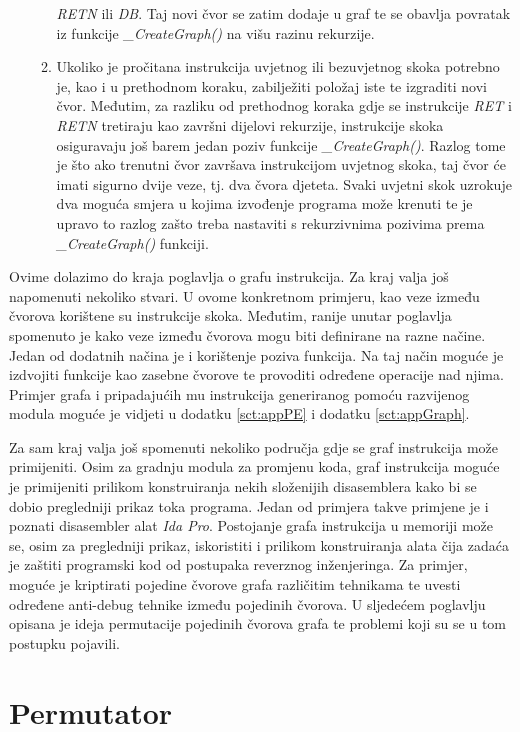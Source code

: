 \documentclass[times, utf8, diplomski, numeric]{fer}
\begin{document}
\begin{enumerate}
\begin{enumerate}
\emph{RETN} ili \emph{DB}. Taj novi čvor se zatim dodaje u graf te se obavlja
povratak iz funkcije \emph{\_CreateGraph()} na višu razinu rekurzije.
\item Ukoliko je pročitana instrukcija uvjetnog ili bezuvjetnog skoka potrebno
je, kao i u prethodnom koraku, zabilježiti položaj iste te izgraditi novi čvor.
Međutim, za razliku od prethodnog koraka gdje se instrukcije \emph{RET} i
\emph{RETN} tretiraju kao završni dijelovi rekurzije, instrukcije skoka
osiguravaju još barem jedan poziv funkcije \emph{\_CreateGraph()}. Razlog tome
je što ako trenutni čvor završava instrukcijom uvjetnog skoka, taj čvor će
imati sigurno dvije veze, tj. dva čvora djeteta. Svaki uvjetni skok uzrokuje
dva moguća smjera u kojima izvođenje programa može krenuti te je upravo to
razlog zašto treba nastaviti s rekurzivnima pozivima prema
\emph{\_CreateGraph()} funkciji.
\end{enumerate}
\end{enumerate} 
Ovime dolazimo do kraja poglavlja o grafu instrukcija. Za kraj valja još
napomenuti nekoliko stvari. U ovome konkretnom primjeru, kao veze između
čvorova korištene su instrukcije skoka. Međutim, ranije unutar poglavlja
spomenuto je kako veze između čvorova mogu biti definirane na razne načine.
Jedan od dodatnih načina je i korištenje poziva funkcija. Na taj način moguće
je izdvojiti funkcije kao zasebne čvorove te provoditi određene operacije nad
njima. Primjer grafa i pripadajućih mu instrukcija generiranog pomoću
razvijenog modula moguće je vidjeti u dodatku \ref{sct:appPE} i dodatku
\ref{sct:appGraph}.

Za sam kraj valja još spomenuti nekoliko područja gdje se graf instrukcija može
primijeniti. Osim za gradnju modula za promjenu koda, graf instrukcija moguće
je primijeniti prilikom konstruiranja nekih složenijih disasemblera kako bi se
dobio pregledniji prikaz toka programa. Jedan od primjera takve primjene je i
poznati disasembler alat \emph{Ida Pro}\citep{ida}. Postojanje grafa
instrukcija u memoriji može se, osim za pregledniji prikaz, iskoristiti i
prilikom konstruiranja alata čija zadaća je zaštiti programski kod od postupaka
reverznog inženjeringa. Za primjer, moguće je kriptirati pojedine čvorove grafa
različitim tehnikama te uvesti određene anti-debug tehnike između pojedinih
čvorova. U sljedećem poglavlju opisana je ideja permutacije pojedinih čvorova
grafa te problemi koji su se u tom postupku pojavili.

\section{Permutator}
\label{sct:permutator}
\end{document}
